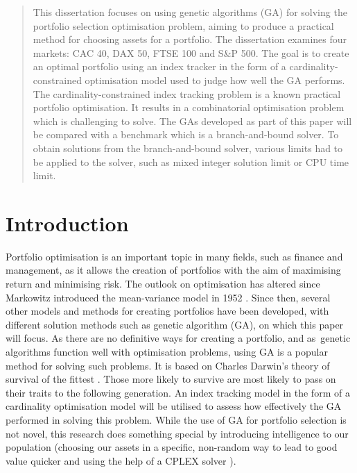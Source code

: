 \documentclass[12pt]{report}
\begin{document}
\renewcommand{\abstractname}{Abstract}
\begin{abstract}
 This dissertation focuses on using genetic algorithms (GA) for solving the portfolio selection optimisation problem, aiming to produce a practical method for choosing assets for a portfolio. The dissertation examines four markets: CAC 40, DAX 50, FTSE 100 and S\&P 500. The goal is to create an optimal portfolio using an index tracker in the form of a cardinality-constrained optimisation model used to judge how well the GA performs. The cardinality-constrained index tracking problem is a known practical portfolio optimisation. It results in a combinatorial optimisation problem which is challenging to solve. The GAs developed as part of this paper will be compared with a benchmark which is a branch-and-bound solver. To obtain solutions from the branch-and-bound solver, various  limits had to be applied to the solver, such as mixed integer solution limit or CPU time limit. 
\end{abstract}

\listoftables
\tableofcontents
\chapter{Introduction}
Portfolio optimisation is an important topic in many fields, such as finance and management, as it allows the creation of portfolios with the aim of maximising return and minimising risk. The outlook on optimisation has altered since Markowitz introduced the mean-variance model in 1952 \cite{source5}. Since then, several other models and methods for creating portfolios have been developed, with different solution methods such as genetic algorithm (GA), on which this paper will focus. As there are no definitive ways for creating a portfolio, and as genetic algorithms function well with optimisation problems, using GA is a popular method for solving such problems. It is based on Charles Darwin's theory of survival of the fittest \cite{source4}. Those more likely to survive are most likely to pass on their traits to the following generation. An index tracking model in the form of a cardinality optimisation model will be utilised to assess how effectively the GA performed in solving this problem. While the use of GA for portfolio selection is not novel, this research does something special by introducing intelligence to our population (choosing our assets in a specific, non-random way to lead to good value quicker and using the help of a CPLEX solver \cite{IBMsolver}).
\end{document}
